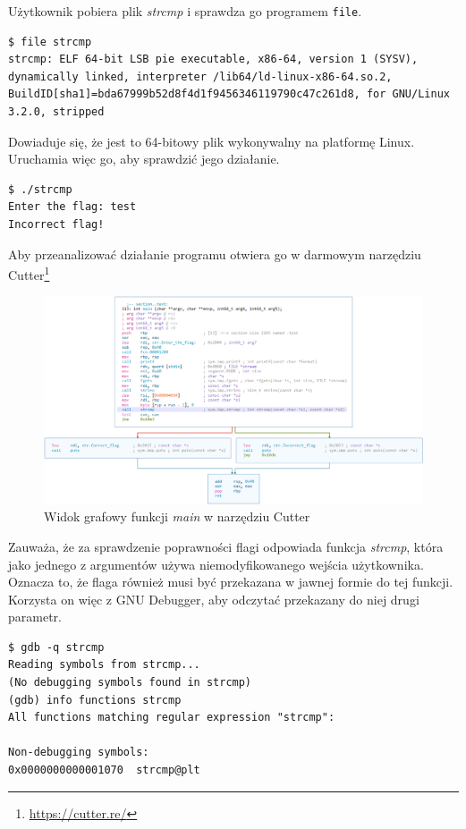 \documentclass[language=polish,type=eng]{aghmodern}
\begin{document}
Użytkownik pobiera plik \emph{strcmp} i sprawdza go programem \texttt{file}.

\begin{verbatim}
$ file strcmp
strcmp: ELF 64-bit LSB pie executable, x86-64, version 1 (SYSV), dynamically linked, interpreter /lib64/ld-linux-x86-64.so.2, BuildID[sha1]=bda67999b52d8f4d1f9456346119790c47c261d8, for GNU/Linux 3.2.0, stripped
\end{verbatim}

Dowiaduje się, że jest to 64-bitowy plik wykonywalny na platformę Linux.
Uruchamia więc go, aby sprawdzić jego działanie.

\begin{verbatim}
$ ./strcmp
Enter the flag: test
Incorrect flag!
\end{verbatim}

Aby przeanalizować działanie programu otwiera go w darmowym narzędziu Cutter\footnote{\url{https://cutter.re/}}

\begin{figure}[H]
\centering
\includegraphics[width=\textwidth]{300_cutter}
\caption{Widok grafowy funkcji \emph{main} w narzędziu Cutter}
\end{figure}

Zauważa, że za sprawdzenie poprawności flagi odpowiada funkcja \emph{strcmp}, która
jako jednego z argumentów używa niemodyfikowanego wejścia użytkownika.
Oznacza to, że flaga również musi być przekazana w jawnej formie do tej funkcji.
Korzysta on więc z GNU Debugger, aby odczytać przekazany do niej drugi parametr.

\begin{verbatim}
$ gdb -q strcmp
Reading symbols from strcmp...
(No debugging symbols found in strcmp)
(gdb) info functions strcmp
All functions matching regular expression "strcmp":

Non-debugging symbols:
0x0000000000001070  strcmp@plt
\end{verbatim}
\end{document}
